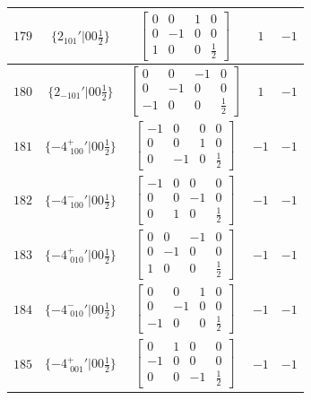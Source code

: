 \documentclass[fleqn,8pt]{jsarticle}
\begin{document}
\begin{longtable}{ccccc}
$ 179 $ & $ \{2{}_{101}{}'|0 0 \frac{1}{2}\} $ & $ \begin{bmatrix} 0 & 0 & 1 & 0 \\ 0 & -1 & 0 & 0 \\ 1 & 0 & 0 & \frac{1}{2} \end{bmatrix} $ & $ 1 $ & $ -1 $ \\ \hline
$ 180 $ & $ \{2{}_{-101}{}'|0 0 \frac{1}{2}\} $ & $ \begin{bmatrix} 0 & 0 & -1 & 0 \\ 0 & -1 & 0 & 0 \\ -1 & 0 & 0 & \frac{1}{2} \end{bmatrix} $ & $ 1 $ & $ -1 $ \\ \hline
$ 181 $ & $ \{-4^{+}_{\,\,100}{}'|0 0 \frac{1}{2}\} $ & $ \begin{bmatrix} -1 & 0 & 0 & 0 \\ 0 & 0 & 1 & 0 \\ 0 & -1 & 0 & \frac{1}{2} \end{bmatrix} $ & $ -1 $ & $ -1 $ \\ \hline
$ 182 $ & $ \{-4^{-}_{\,\,100}{}'|0 0 \frac{1}{2}\} $ & $ \begin{bmatrix} -1 & 0 & 0 & 0 \\ 0 & 0 & -1 & 0 \\ 0 & 1 & 0 & \frac{1}{2} \end{bmatrix} $ & $ -1 $ & $ -1 $ \\ \hline
$ 183 $ & $ \{-4^{+}_{\,\,010}{}'|0 0 \frac{1}{2}\} $ & $ \begin{bmatrix} 0 & 0 & -1 & 0 \\ 0 & -1 & 0 & 0 \\ 1 & 0 & 0 & \frac{1}{2} \end{bmatrix} $ & $ -1 $ & $ -1 $ \\ \hline
$ 184 $ & $ \{-4^{-}_{\,\,010}{}'|0 0 \frac{1}{2}\} $ & $ \begin{bmatrix} 0 & 0 & 1 & 0 \\ 0 & -1 & 0 & 0 \\ -1 & 0 & 0 & \frac{1}{2} \end{bmatrix} $ & $ -1 $ & $ -1 $ \\ \hline
$ 185 $ & $ \{-4^{+}_{\,\,001}{}'|0 0 \frac{1}{2}\} $ & $ \begin{bmatrix} 0 & 1 & 0 & 0 \\ -1 & 0 & 0 & 0 \\ 0 & 0 & -1 & \frac{1}{2} \end{bmatrix} $ & $ -1 $ & $ -1 $ \\ \hline

\end{longtable}
\end{document}
